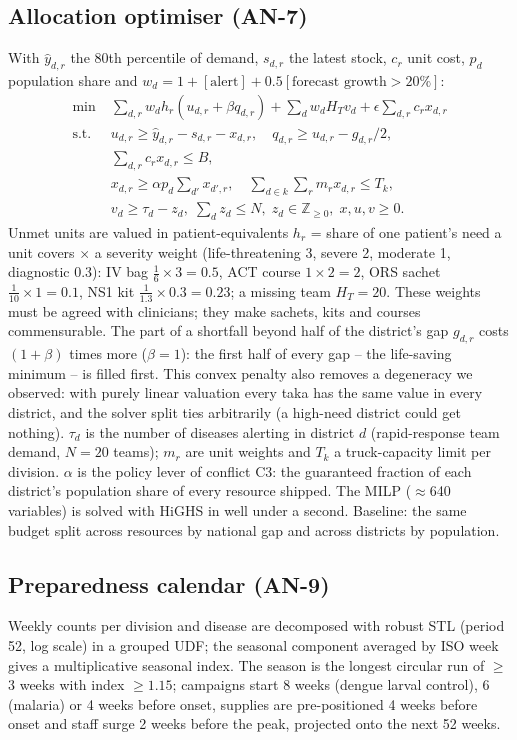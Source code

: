 \documentclass[conference]{IEEEtran}
\begin{document}
\subsection{Allocation optimiser (AN-7)}
With $\hat y_{d,r}$ the 80th percentile of demand, $s_{d,r}$ the latest stock, $c_r$ unit cost, $p_d$
population share and $w_d = 1 + [\text{alert}] + 0.5[\text{forecast growth}>20\%]$:
\begin{align*}
\min\;& \textstyle\sum_{d,r} w_d h_r (u_{d,r}+\beta q_{d,r}) + \sum_d w_d H_T v_d + \epsilon\sum_{d,r} c_r x_{d,r}\\
\text{s.t. }& u_{d,r}\geq \hat y_{d,r}-s_{d,r}-x_{d,r},\quad q_{d,r}\geq u_{d,r}-g_{d,r}/2,\\
& \textstyle\sum_{d,r} c_r x_{d,r}\leq B,\\
& x_{d,r}\geq \alpha p_d \textstyle\sum_{d'} x_{d',r},\quad \sum_{d\in k}\sum_r m_r x_{d,r}\leq T_k,\\
& v_d\geq \tau_d - z_d,\; \textstyle\sum_d z_d\leq N,\; z_d\in\mathbb Z_{\geq0},\; x,u,v\geq0.
\end{align*}
Unmet units are valued in patient-equivalents $h_r$ = share of one patient's need a unit covers $\times$ a
severity weight (life-threatening 3, severe 2, moderate 1, diagnostic 0.3): IV bag $\tfrac16\times3=0.5$, ACT
course $1\times2=2$, ORS sachet $\tfrac1{10}\times1=0.1$, NS1 kit $\tfrac1{1.3}\times0.3=0.23$; a missing team
$H_T=20$. These weights must be agreed with clinicians; they make sachets, kits and courses commensurable. The part of a shortfall beyond half of the district's gap $g_{d,r}$ costs $(1+\beta)$ times more
($\beta=1$): the first half of every gap -- the life-saving minimum -- is filled first. This convex penalty also
removes a degeneracy we observed: with purely linear valuation every taka has the same value in every district,
and the solver split ties arbitrarily (a high-need district could get nothing). $\tau_d$ is the number
of diseases alerting in district $d$ (rapid-response team demand, $N=20$ teams); $m_r$ are unit weights and
$T_k$ a truck-capacity limit per division. $\alpha$ is the policy lever of conflict C3: the guaranteed
fraction of each district's population share of every resource shipped. The MILP ($\approx$640 variables) is
solved with HiGHS \cite{huangfu2018} in well under a second. Baseline: the same budget split across resources
by national gap and across districts by population.

\subsection{Preparedness calendar (AN-9)}
Weekly counts per division and disease are decomposed with robust STL \cite{cleveland1990} (period 52, log
scale) in a grouped UDF; the seasonal component averaged by ISO week gives a multiplicative seasonal index.
The season is the longest circular run of $\geq$3 weeks with index $\geq1.15$; campaigns start 8 weeks
(dengue larval control), 6 (malaria) or 4 weeks before onset, supplies are pre-positioned 4 weeks before
onset and staff surge 2 weeks before the peak, projected onto the next 52 weeks.
\end{document}
